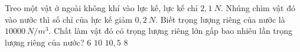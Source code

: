 \begin{ex}%
Treo một vật ở ngoài không khí vào lực kế, lực kế chỉ $2,1\ N$. Nhúng chìm vật đó vào nước thì số chỉ của lực kế giảm $0,2\ N$. Biết trọng lượng riêng của nước là $10000\ N / m^3$. Chất làm vật đó có trọng lượng riêng lớn gấp bao nhiêu lần trọng lượng riêng của nước? 
\choice
{$6$}
{$10$}
{\True $10,5$}
{$8$}
 \end{ex}





